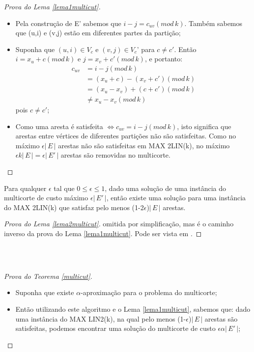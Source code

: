 \documentclass[12pt,a4paper]{article}
\begin{document}
\begin{itemize}
\begin{proof}[Prova do Lema \ref{lema1multicut}]
\begin{itemize}
            \item Pela construção de E’ sabemos que $i-j=c_{uv}(mod\,k)$. Também sabemos que (u,i) e (v,j) estão em diferentes partes da partição;
            \item Suponha que $(u,i) \in V_c$ e $(v,j) \in V_c$' para $c \ne c'$. Então $i=x_u+c(mod\,k)$ e $j=x_v+c'(mod\,k)$, e portanto:
            \begin{align*}
                c_{uv} &= i-j(mod\,k) \\
                       &= (x_u+c)-(x_v+c')(mod\,k) \\
                       &= (x_u-x_v)+(c+c')(mod\,k) \\
                       &\ne x_u-x_v(mod\,k)
            \end{align*}
            pois $c \ne c'$;
            \item Como uma aresta é satisfeita $\iff c_{uv} = i-j(mod\,k)$, isto significa que arestas entre vértices de diferentes partições não são satisfeitas. Como no máximo $\epsilon|\,E\,|$ arestas não são satisfeitas em MAX 2LIN(k), no máximo $\epsilon k|\,E\,| = \epsilon|\,E'\,|$ arestas são removidas no multicorte.
        \end{itemize}
    \end{proof}
    \begin{lema} \label{lema2multicut}
        Para qualquer $\epsilon$ tal que $0 \le \epsilon \le 1$, dado uma solução de uma instância do multicorte de custo máximo $\epsilon|\,E'\,|$, então existe uma solução para uma instância do MAX 2LIN(k) que satisfaz pelo menos (1-2$\epsilon$)$|\,E\,|$ arestas.
    \end{lema}
    \begin{proof}[Prova do Lema \ref{lema2multicut}] omitida por simplificação, mas é o caminho inverso da prova do Lema \ref{lema1multicut}. Pode ser vista em \cite{design_approx_algs}.
    \end{proof}\\\\
    \begin{proof}[Prova do Teorema \ref{multicut}]
    \begin{itemize}
        \item Suponha que existe $\alpha$-aproximação para o problema do multicorte;
        \item Então utilizando este algoritmo e o Lema \ref{lema1multicut}, sabemos que: dado uma instância do MAX LIN2(k), na qual pelo menos (1-$\epsilon$)$|\,E\,|$ arestas são satisfeitas, podemos encontrar uma solução do multicorte de custo $\epsilon \alpha|\,E'\,|$;

\end{itemize}
\end{proof}
\end{itemize}
\end{document}

